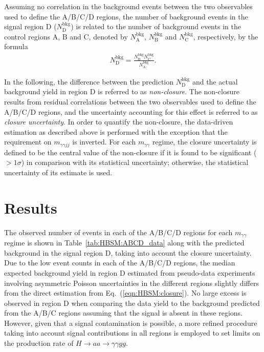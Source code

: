 Assuming no correlation in the background events between the two observables used to define the A/B/C/D regions,
the number of background events in the signal region D ($N^\text{bkg}_\text{D}$) is related to the number
of background events in the control regions A, B and C, denoted by $N^\text{bkg}_\text{A}$, $N^\text{bkg}_\text{B}$
and $N^\text{bkg}_\text{C}$, respectively, by the formula
\begin{align}
N^\text{bkg}_\text{D} = \frac{N^\text{bkg}_\text{B}N^\text{bkg}_\text{C}}{N^\text{bkg}_\text{A}}.
\label{eqn:HBSM:closure}
\end{align}

In the following, the difference between the prediction $N^\text{bkg}_\text{D}$ and the actual background yield in region D 
is referred to as \textit{non-closure}.
The non-closure results from residual correlations between the two observables used to define the A/B/C/D regions,
and the uncertainty accounting for this effect is referred to as \textit{closure uncertainty}.
In order to quantify the non-closure, the data-driven estimation as described above is performed 
with the exception that the requirement on $m_{\gamma\gamma jj}$ is inverted.
For each $m_{\gamma\gamma}$ regime,
the closure uncertainty is defined to be 
the central value of the non-closure if it is found to be significant ($>1\sigma$) in comparison with its statistical uncertainty; 
otherwise, the statistical uncertainty of its estimate is used.

\section{Results}
The observed number of events in each of the A/B/C/D regions for each $m_{\gamma\gamma}$ regime is shown in Table~\ref{tab:HBSM:ABCD_data}
along with the predicted background in the signal region D, taking into account the closure uncertainty. 
Due to the low event counts in each of the A/B/C/D regions,
the median expected background yield in region D estimated from pseudo-data experiments involving asymmetric Poisson uncertainties 
in the different regions slightly differs from the direct estimation from Eq.~(\ref{eqn:HBSM:closure}).
No large excess is observed in region D when comparing the data yield to the background predicted from the A/B/C regions
assuming that the signal is absent in these regions.
However, given that a signal contamination is possible, a more refined procedure
taking into account signal contributions in all regions
is employed to set limits on the production rate of $H\to aa \to \gamma\gamma gg$.

